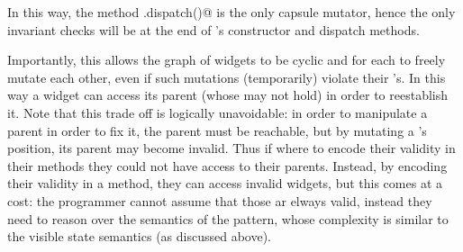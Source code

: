 In this way, the method \Q@WidgetWithInvariant.dispatch()@ is the only capsule mutator, hence the only invariant checks will be at the end of \Q@WidgetWithInvariant@'s constructor and dispatch methods.

Importantly, this allows the graph of widgets to be cyclic and for each to freely mutate each
other, even if such mutations (temporarily) violate their \Q@subInvariant@'s.
In this way a widget can access its parent (whose \Q@subInvariant@ may not hold) in order to reestablish it.
Note that this trade off is logically unavoidable:
in order to manipulate a parent in order to fix it, the parent must be reachable, but
by mutating a \Q@Widget@'s position, its parent may become invalid.
Thus if \Q@Widget@s where to encode their validity in their \Q@invariant@ methods they could not have access to their parents.
Instead, by encoding their validity in a \Q@subInvariant@ method,
they can access invalid widgets, but this comes at a cost: the programmer 
cannot assume that those \Q@Widgets@ ar elways valid, instead they
need to reason over the semantics of the \Q@subInvariant@ pattern, whose complexity is similar to the visible state semantics (as discussed above). 


